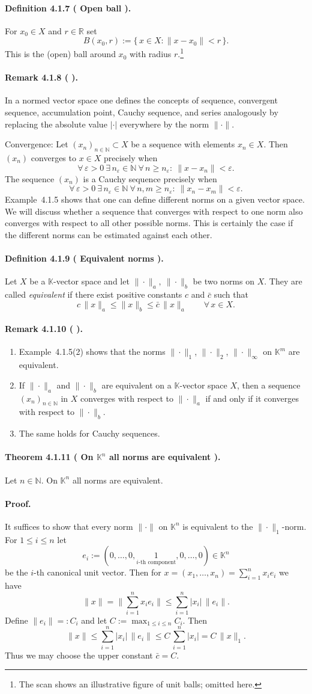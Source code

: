\documentclass[12pt,a4paper]{article}
\newcommand{\N}{\mathbb{N}}
\newcommand{\R}{\mathbb{R}}
\newcommand{\K}{\mathbb{K}} %
\newcommand{\eps}{\varepsilon}
\newcommand{\NumberedDefinition}[3]{%
\paragraph*{Definition #1 ( #2 ).} #3\par}
\newcommand{\NumberedTheorem}[3]{%
\paragraph*{Theorem #1 ( #2 ).} #3\par}
\newcommand{\NumberedRemark}[3]{%
\paragraph*{Remark #1 ( #2 ).} #3\par}
\theoremstyle{plain}
\theoremstyle{definition}
\theoremstyle{remark}
\begin{document}
	\NumberedDefinition{4.1.7}{Open ball}{For $x_0\in X$ and $r\in\R$ set
	\[
		B(x_0,r) := \{\, x\in X : \|x - x_0\| < r \,\}.
	\]
	This is the (open) ball around $x_0$ with radius $r$.\footnote{The scan shows an illustrative figure of unit balls; omitted here.}}

	\NumberedRemark{4.1.8}{}{In a normed vector space one defines the concepts of sequence, convergent sequence, accumulation point, Cauchy sequence, and series analogously by replacing the absolute value $|\cdot|$ everywhere by the norm $\|\cdot\|$.

	Convergence: Let $(x_n)_{n\in\N}\subset X$ be a sequence with elements $x_n\in X$. Then $(x_n)$ converges to $x\in X$ precisely when
	\[
		\forall\,\eps>0\ \exists\, n_\eps\in\N\ \forall\, n\ge n_\eps:\ \|x - x_n\| < \eps.
	\]
	The sequence $(x_n)$ is a Cauchy sequence precisely when
	\[
		\forall\,\eps>0\ \exists\, n_\eps\in\N\ \forall\, n,m\ge n_\eps:\ \|x_n - x_m\| < \eps.
	\]
	Example~4.1.5 shows that one can define different norms on a given vector space. We will discuss whether a sequence that converges with respect to one norm also converges with respect to all other possible norms. This is certainly the case if the different norms can be estimated against each other.}

	\NumberedDefinition{4.1.9}{Equivalent norms}{Let $X$ be a $\K$-vector space and let $\|\cdot\|_a,\ \|\cdot\|_b$ be two norms on $X$. They are called \emph{equivalent} if there exist positive constants $c$ and $\bar c$ such that
	\[
		c\,\|x\|_a \le \|x\|_b \le \bar c\,\|x\|_a \qquad \forall\, x\in X.
	\]}

	\NumberedRemark{4.1.10}{}{\begin{enumerate}[label={(\arabic*)}, leftmargin=*]
		\item Example~4.1.5(2) shows that the norms $\|\cdot\|_1$, $\|\cdot\|_2$, $\|\cdot\|_\infty$ on $\K^{m}$ are equivalent.
		\item If $\|\cdot\|_a$ and $\|\cdot\|_b$ are equivalent on a $\K$-vector space $X$, then a sequence $(x_n)_{n\in\N}$ in $X$ converges with respect to $\|\cdot\|_a$ if and only if it converges with respect to $\|\cdot\|_b$.
		\item The same holds for Cauchy sequences.
	\end{enumerate}}

	\NumberedTheorem{4.1.11}{On $\K^{n}$ all norms are equivalent}{Let $n\in\N$. On $\K^{n}$ all norms are equivalent.}
	\paragraph{Proof.}
	It suffices to show that every norm $\|\cdot\|$ on $\K^{n}$ is equivalent to the $\|\cdot\|_{1}$-norm. For $1\le i\le n$ let
	\[
		e_i := (0,\dots,0,\underset{\text{$i$-th component}}{1},0,\dots,0)\in\K^{n}
	\]
	be the $i$-th canonical unit vector. Then for $x=(x_1,\dots,x_n)=\sum_{i=1}^{n} x_i e_i$ we have
	\[
		\|x\| = \bigg\|\sum_{i=1}^{n} x_i e_i\bigg\| \le \sum_{i=1}^{n} |x_i|\,\|e_i\|.
	\]
	Define $\|e_i\| =: C_i$ and let $C := \max_{1\le i\le n} C_i$. Then
	\[
		\|x\| \le \sum_{i=1}^{n} |x_i|\,\|e_i\| \le C\, \sum_{i=1}^{n} |x_i| = C\,\|x\|_{1}.
	\]
	Thus we may choose the upper constant $\bar c=C$.
\end{document}
